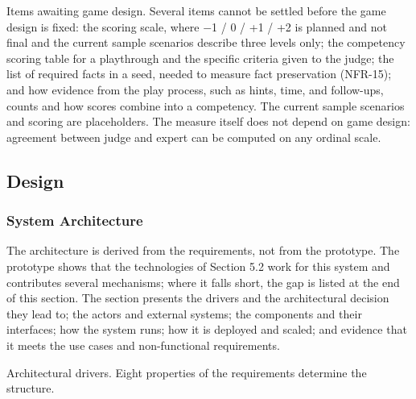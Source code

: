 Items awaiting game design. Several items cannot be settled before the game design is fixed: the scoring scale, where $-$1 / 0 / +1 / +2 is planned and not final and the current sample scenarios describe three levels only; the competency scoring table for a playthrough and the specific criteria given to the judge; the list of required facts in a seed, needed to measure fact preservation (NFR-15); and how evidence from the play process, such as hints, time, and follow-ups, counts and how scores combine into a competency. The current sample scenarios and scoring are placeholders. The measure itself does not depend on game design: agreement between judge and expert can be computed on any ordinal scale.

\subsection{Design}

\subsubsection{System Architecture}

The architecture is derived from the requirements, not from the prototype. The prototype shows that the technologies of Section 5.2 work for this system and contributes several mechanisms; where it falls short, the gap is listed at the end of this section. The section presents the drivers and the architectural decision they lead to; the actors and external systems; the components and their interfaces; how the system runs; how it is deployed and scaled; and evidence that it meets the use cases and non-functional requirements.

Architectural drivers. Eight properties of the requirements determine the structure.

